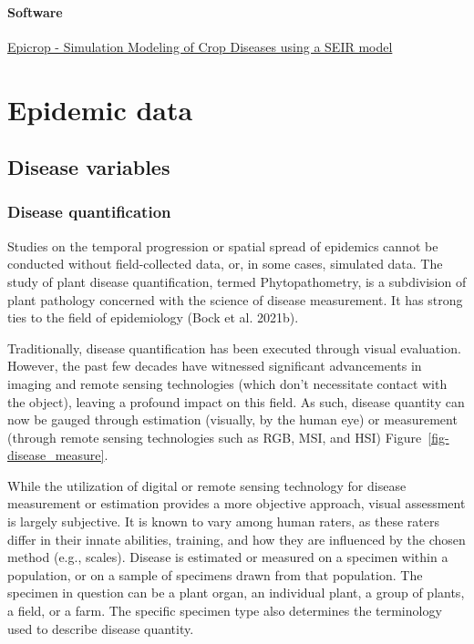 \documentclass[
  letterpaper,
]{book}
\begin{document}
\hypertarget{software}{%
\subsection{Software}\label{software}}

\href{http://adamhsparks.github.io/epicrop/}{Epicrop - Simulation
Modeling of Crop Diseases using a SEIR model}

\part{Epidemic data}

\hypertarget{disease-variables}{%
\chapter{Disease variables}\label{disease-variables}}

\hypertarget{disease-quantification}{%
\section{Disease quantification}\label{disease-quantification}}

Studies on the temporal progression or spatial spread of epidemics
cannot be conducted without field-collected data, or, in some cases,
simulated data. The study of plant disease quantification, termed
Phytopathometry, is a subdivision of plant pathology concerned with the
science of disease measurement. It has strong ties to the field of
epidemiology (Bock et al. 2021b).

Traditionally, disease quantification has been executed through visual
evaluation. However, the past few decades have witnessed significant
advancements in imaging and remote sensing technologies (which don't
necessitate contact with the object), leaving a profound impact on this
field. As such, disease quantity can now be gauged through estimation
(visually, by the human eye) or measurement (through remote sensing
technologies such as RGB, MSI, and HSI)
Figure~\ref{fig-disease_measure}.

While the utilization of digital or remote sensing technology for
disease measurement or estimation provides a more objective approach,
visual assessment is largely subjective. It is known to vary among human
raters, as these raters differ in their innate abilities, training, and
how they are influenced by the chosen method (e.g., scales). Disease is
estimated or measured on a specimen within a population, or on a sample
of specimens drawn from that population. The specimen in question can be
a plant organ, an individual plant, a group of plants, a field, or a
farm. The specific specimen type also determines the terminology used to
describe disease quantity.
\end{document}
